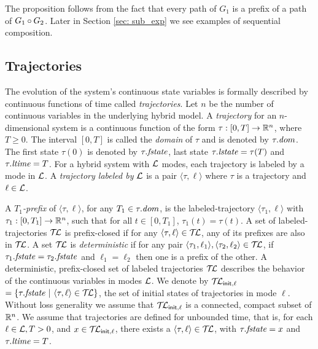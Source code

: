 The proposition follows from the fact that every path of $G_1$ is a
prefix of a path of $G_1\circ G_2$. Later in Section \ref{sec: sub_exp} we see examples of sequential composition.


%

\subsection{Trajectories}

The evolution of the system's continuous state variables is formally
described by continuous functions of time called {\em trajectories\/}.
Let $n$ be the number of continuous variables in the underlying hybrid
model. A {\em trajectory\/} for an $n$-dimensional system is a
continuous function of the form $\tau: [0,T] \rightarrow \reals^n$,
where $T \geq 0$. The interval $[0,T]$ is called the {\em domain\/} of
$\tau$ and is denoted by $\tau.{\mathit dom}$. The first state $\tau(0)$ is
denoted by $\tau.\mathit{fstate}$, last state $\tau.\mathit{lstate} = \tau(T)$ and
$\tau.\mathit{ltime} = T$.
%
For a hybrid system with ${\mathcal L}$ modes, each trajectory is labeled by a
mode in ${\mathcal L}$.  A {\em trajectory labeled by ${\mathcal L}$\/} is a pair $\langle
\tau, \ell \rangle$ where $\tau$ is a trajectory and $\ell \in {\mathcal L}$.
 
A {\em $T_1$-prefix\/} of $\langle \tau, \ell\rangle$, for any $T_1
\in \tau.{\mathit dom}$, is the labeled-trajectory $\langle \tau_1,
\ell\rangle$ with $\tau_1:[0,T_1] \rightarrow \reals^n$, such that for
all $t \in [0, T_1]$, $\tau_1(t) = \tau(t)$.
%
A set of labeled-trajectories $\mathcal{T\mkern-3mu L}$ is prefix-closed if for any
$\langle \tau,\ell \rangle \in \mathcal{T\mkern-3mu L}$, any of its prefixes are also in
$\mathcal{T\mkern-3mu L}$.  A set $\mathcal{T\mkern-3mu L}$ is {\em deterministic\/} if for any pair $\langle
\tau_1, \ell_1 \rangle, \langle \tau_2,\ell_2 \rangle \in \mathcal{T\mkern-3mu L}$, if
$\tau_1.\mathit{fstate} = \tau_2.\mathit{fstate}$ and $\ell_1 = \ell_2$ then one is a
prefix of the other.
%
A deterministic, prefix-closed set of labeled trajectories $\mathcal{T\mkern-3mu L}$
describes the behavior of the continuous variables in modes ${\mathcal L}$.
%
We denote by $\mathcal{T\mkern-3mu L}_{\sf init,\ell}$ $=\{ \tau.\mathit{fstate} \ | \ \langle
\tau,\ell \rangle \in \mathcal{T\mkern-3mu L} \}$, the set of initial states of
trajectories in mode $\ell$. Without loss generality we assume that
$\mathcal{T\mkern-3mu L}_{{\sf init},\ell}$ is a connected, compact subset of $\reals^n$.
%
We assume that trajectories are defined for unbounded time, that is,
for each $\ell \in {\mathcal L}, T >0$, and $x \in \mathcal{T\mkern-3mu L}_{{\sf init},\ell}$, there
exists a $\langle \tau, \ell \rangle \in \mathcal{T\mkern-3mu L}$, with $\tau.\mathit{fstate} = x$
and $\tau.\mathit{ltime} = T$.  


